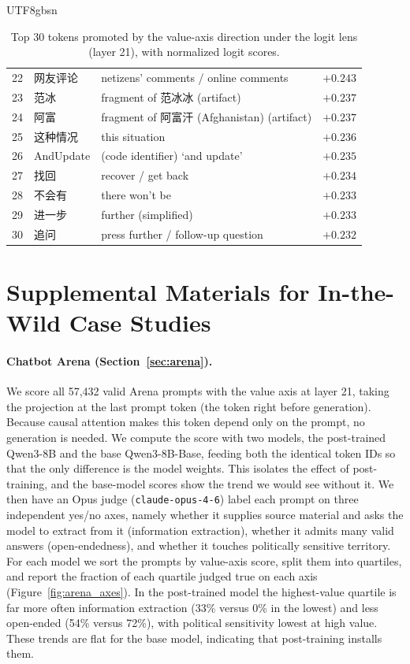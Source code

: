 \documentclass{article}
\begin{document}
\begin{table}[h]
\begin{CJK}{UTF8}{gbsn}
\begin{tabular}{rllr}
22 & 网友评论   & netizens' comments / online comments      & $+0.243$ \\
23 & 范冰       & fragment of 范冰冰 (artifact)           & $+0.237$ \\
24 & 阿富       & fragment of 阿富汗 (Afghanistan) (artifact) & $+0.237$ \\
25 & 这种情况   & this situation                            & $+0.236$ \\
26 & AndUpdate  & (code identifier) `and update'            & $+0.235$ \\
27 & 找回       & recover / get back                        & $+0.234$ \\
28 & 不会有     & there won't be                            & $+0.233$ \\
29 & 进一步     & further (simplified)                      & $+0.233$ \\
30 & 追问       & press further / follow-up question        & $+0.232$ \\
\bottomrule
\end{tabular}
\end{CJK}
\caption{Top 30 tokens promoted by the value-axis direction under the logit lens (layer 21), with normalized logit scores.}
\label{tab:logit_lens}
\end{table}

\section{Supplemental Materials for In-the-Wild Case Studies}
\label{app:wild_methods}

\paragraph{Chatbot Arena (Section~\ref{sec:arena}).}
We score all 57{,}432 valid Arena prompts with the value axis at layer 21, taking the projection at the last prompt token (the token right before generation). Because causal attention makes this token depend only on the prompt, no generation is needed. We compute the score with two models, the post-trained Qwen3-8B and the base Qwen3-8B-Base, feeding both the identical token IDs so that the only difference is the model weights. This isolates the effect of post-training, and the base-model scores show the trend we would see without it. We then have an Opus judge (\texttt{claude-opus-4-6}) label each prompt on three independent yes/no axes, namely whether it supplies source material and asks the model to extract from it (information extraction), whether it admits many valid answers (open-endedness), and whether it touches politically sensitive territory. For each model we sort the prompts by value-axis score, split them into quartiles, and report the fraction of each quartile judged true on each axis (Figure~\ref{fig:arena_axes}). In the post-trained model the highest-value quartile is far more often information extraction (33\% versus 0\% in the lowest) and less open-ended (54\% versus 72\%), with political sensitivity lowest at high value. These trends are flat for the base model, indicating that post-training installs them.
\end{document}
